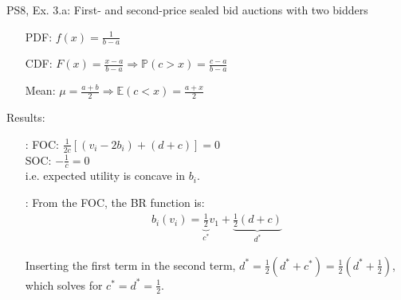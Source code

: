 \begin{frame}{PS8, Ex. 3.a: First- and second-price sealed bid auctions with two bidders}
\begin{multicols}{2}
\begin{enumerate}
        \item[PDF:] $f(x)=\frac{1}{b-a}$
        \item[CDF:] $F(x)=\frac{x-a}{b-a}\Rightarrow\mathbb{P}(c>x)=\frac{c-a}{b-a}$
        \item[Mean:] $\mu=\frac{a+b}{2}\Rightarrow\mathbb{E}(c<x)=\frac{a+x}{2}$
      \end{enumerate}
      \vspace{-6pt}
      Results:
      \vspace{-6pt}
      \begin{itemize}
        \item[\nth{2}:] FOC: $\frac{1}{2c}[(v_i-2b_i)+(d+c)]=0$\\
                        SOC: $-\frac{1}{c}=0$\\
                        i.e. expected utility is concave in $b_i$.
        \item[\nth{3}:] From the FOC, the BR function is:\vspace{-6pt}
                        \begin{align*}
                          b_i(v_i)=\underbrace{\frac{1}{2}}_{c^*}v_1+\underbrace{\frac{1}{2}(d+c)}_{d^*}
                        \end{align*}
        \item[]         \vspace{-6pt} Inserting the first term in the second term, $d^*=\frac{1}{2}(d^*+c^*)=\frac{1}{2}(d^*+\frac{1}{2})$, which solves for $c^*=d^*=\frac{1}{2}$.
      \end{itemize}
      \vfill\null
    \end{multicols}
\end{frame}


